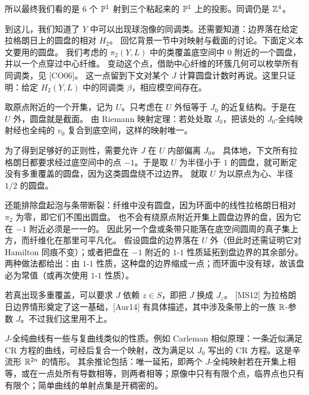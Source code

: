 所以最终我们看的是 $6$ 个 $\mathbb{P}^1$ 射到三个粘起来的 $\mathbb{P}^1$ 上的投影。同调仍是 $\mathbb{Z}^4$。

到这儿，我们知道了 $Y$ 中可以出现球泡像的同调类。还需要知道：边界落在给定拉格朗日上的圆盘的相对 $H_2$。
回忆背景一节中对映射与截面的讨论。下面定义本文要用的圆盘。
我们考虑的 $\pi_2(Y,L)$ 中的类覆盖底空间中 $0$ 附近的一个圆盘，并以一个点穿过中心纤维。
变动这个点，借助中心纤维的环簇几何可以枚举所有同调类，见 [CO06]。
这一点留到下文对某个 $J$ 计算圆盘计数时再说。这里只证明：给定 $H_2(Y,L)$ 中的同调类 $\beta$，相应模空间存在。


\begin{definition}[类截面映射]\label{c7:def-section-like}
取原点附近的一个开集，记为 $U$。只考虑在 $U$ 外恒等于 $J_0$ 的近复结构。于是在 $U$ 外，圆盘就是截面。
由 Riemann 映射定理：若处处取 $J_0$，把该处的 $J_0$-全纯映射经也全纯的 $v_0$ 复合到底空间，这样的映射唯一。

为了得到足够好的正则性，需要允许 $J$ 在 $U$ 内部偏离 $J_0$。
具体地，下文所有拉格朗日都要求经过底空间中的点 $-1$。于是取 $U$ 为半径小于 $1$ 的圆盘，就可断定没有多重覆盖的圆盘，因为这类圆盘绕不过边界。
就取 $U$ 为以原点为心、半径 $1/2$ 的圆盘。

还能排除盘起泡与条带断裂：纤维中没有圆盘，因为环面中的线性拉格朗日相对 $\pi_2$ 为零，即它们不围出圆盘。
也不会有绕原点附近开集上圆盘边界的盘，因为它在 $-1$ 附近必须是一一的。
因此另一个盘或条带只能落在底空间圆周的真子集上方，而纤维化在那里可平凡化。
假设圆盘的边界落在 $U$ 外（但此时还需证明它对 Hamilton 同痕不变）；或者把盘在 $-1$ 附近的 $1$-$1$ 性质延拓到盘边界的其余部分。
两种做法都给出：由 $1$-$1$ 性质，这种盘的边界缩成一点；而环面中没有球，故该盘必为常值（或再次使用 $1$-$1$ 性质）。

若真出现多重覆盖，可以要求 $J$ 依赖 $z\in S$，即把 $J$ 换成 $J_z$。
[MS12] 为拉格朗日边界情形奠定了这一基础，[Aur14] 有具体描述，其中涉及条带上的一族 $\mathbb{R}$-参数 $J$。不过我们这里用不上。
\end{definition}


\begin{corollary}\label{c7:cor-J-curve}
$J$-全纯曲线有一些与复曲线类似的性质。例如 Carleman 相似原理：一条近似满足 CR 方程的曲线，可经后复合一个映射，改为满足以 $J_0$ 写出的 CR 方程。这是辛流形 $\mathbb{R}^{2n}$ 的情形。
其余推论包括：唯一延拓，即两个 $J$-全纯映射若在开集上相等，或在一点处所有导数相等，则两者相等；原像中只有有限个点，临界点也只有有限个；简单曲线的单射点集是开稠密的。
\end{corollary}

